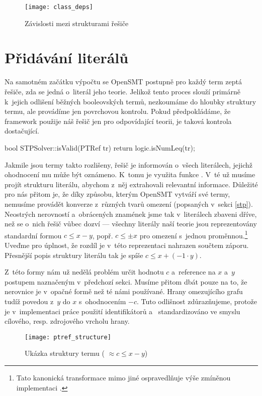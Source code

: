 \begin{figure}
	\centering
	\texttt{[image: class\_deps]}
	\caption{Závislosti mezi strukturami řešiče}
\end{figure}

\section{Přidávání literálů}\label{add}

Na samotném začátku výpočtu se OpenSMT postupně pro každý term zeptá řešiče, zda se jedná o~literál jeho teorie. Jelikož tento proces slouží primárně k~jejich odlišení běžných booleovských termů, nezkoumáme do hloubky struktury termu, ale provádíme jen povrchovou kontrolu. Pokud předpokládáme, že framework použije náš řešič jen pro odpovídající teorii, je taková kontrola dostačující.
\begin{code}
bool STPSolver::isValid(PTRef tr) { return logic.isNumLeq(tr); }
\end{code}

Jakmile jsou termy takto rozlišeny, řešič je informován o~všech literálech, jejichž ohodnocení mu může být oznámeno. K~tomu je využita funkce . V~té už musíme projít strukturu literálu, abychom z~něj extrahovali relevantní informace. Důležité pro nás přitom je, že díky způsobu, kterým OpenSMT vytváří své termy, nemusíme provádět konverze z~různých tvarů omezení (popsaných v~sekci \ref{stp}). Neostrých nerovností a~obrácených znamének jsme tak v~literálech zbaveni dříve, než se o~nich řešič vůbec dozví --- všechny literály naší teorie jsou reprezentovány standardní formou $c \leq x - y$, popř. $c \leq \pm x$ pro omezení s~jednou proměnnou.\footnote{Tato kanonická transformace mimo jiné ospravedlňuje výše zmíněnou implementaci .} Uveďme pro úplnost, že rozdíl je v~této reprezentaci nahrazen součtem záporu. Přesnější popis struktury literálu tak je spíše $c \leq x + (-1 \cdot y)$.

Z~této formy nám už nedělá problém určit hodnotu $c$ a~reference na $x$ a~$y$ postupem naznačeným v~předchozí sekci. Musíme přitom dbát pouze na to, že nerovnice je v~opačné formě než té námi používané. Hrany omezujícího grafu tudíž povedou z~$y$ do $x$ s~ohodnocením $-c$. Tuto odlišnost zdůrazňujeme, protože je v~implementaci práce použití identifikátorů  a~ standardizováno ve smyslu cílového, resp. zdrojového vrcholu hrany.

\begin{figure}
	\centering
	\texttt{[image: ptref\_structure]}
	\caption{Ukázka struktury termu ( $\approx c \leq x - y$)}
\end{figure}

